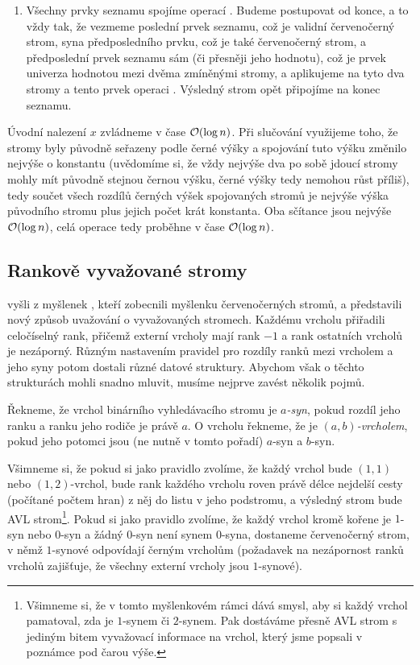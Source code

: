\begin{enumerate}
\item Všechny prvky seznamu spojíme operací . Budeme postupovat od konce, a to vždy tak, že vezmeme poslední prvek seznamu, což je validní červenočerný strom, syna předposledního prvku, což je také červenočerný strom, a předposlední prvek seznamu sám (či přesněji jeho hodnotu), což je prvek univerza hodnotou mezi dvěma zmíněnými stromy, a aplikujeme na tyto dva stromy a tento prvek operaci . Výsledný strom opět připojíme na konec seznamu. 

\end{enumerate}

Úvodní nalezení $x$ zvládneme v čase $\mathcal O(\log n)$. Při slučování využijeme toho, že stromy byly původně seřazeny podle černé výšky a spojování tuto výšku změnilo nejvýše o konstantu (uvědomíme si, že vždy nejvýše dva po sobě jdoucí stromy mohly mít původně stejnou černou výšku, černé výšky tedy nemohou růst příliš), tedy součet všech rozdílů černých výšek spojovaných stromů je nejvýše výška původního stromu plus jejich počet krát konstanta. Oba sčítance jsou nejvýše $\mathcal O(\log n)$, celá operace  tedy proběhne v čase $\mathcal O(\log n)$.

\subsection{Rankově vyvažované stromy}

\citet{rankbalanced} vyšli z myšlenek \citet{dichromatic}, kteří zobecnili
myšlenku červenočerných stromů, a představili nový způsob uvažování o
vyvažovaných stromech. Každému vrcholu přiřadili celočíselný rank, přičemž
externí vrcholy mají rank $-1$ a rank ostatních vrcholů je nezáporný. Různým
nastavením pravidel pro rozdíly ranků mezi vrcholem a jeho syny potom dostali
různé datové struktury. Abychom však o těchto strukturách mohli snadno mluvit,
musíme nejprve zavést několik pojmů.

\begin{definice}
Řekneme, že vrchol binárního vyhledávacího stromu je \emph{$a$-syn}, pokud rozdíl jeho ranku a ranku jeho rodiče je právě $a$. O vrcholu řekneme, že je \emph{$(a,b)$-vrcholem}, pokud jeho potomci jsou (ne nutně v tomto pořadí) $a$-syn a $b$-syn.
\end{definice}

Všimneme si, že pokud si jako pravidlo zvolíme, že každý vrchol bude $(1,1)$
nebo $(1,2)$-vrchol, bude rank každého vrcholu roven právě délce nejdelší cesty
(počítané počtem hran) z něj do listu v jeho podstromu, a výsledný strom bude
AVL strom\footnote{Všimneme si, že v tomto myšlenkovém rámci dává smysl, aby si každý vrchol pamatoval, zda je $1$-synem či $2$-synem. Pak dostáváme přesně AVL strom s jediným bitem vyvažovací informace na vrchol, který jsme popsali v poznámce pod čarou výše.}. Pokud si jako pravidlo zvolíme, že každý vrchol kromě kořene je
$1$-syn nebo $0$-syn a žádný $0$-syn není synem $0$-syna, dostaneme
červenočerný strom, v němž $1$-synové odpovídají černým vrcholům (požadavek na
nezápornost ranků vrcholů zajišťuje, že všechny externí vrcholy jsou
$1$-synové).

